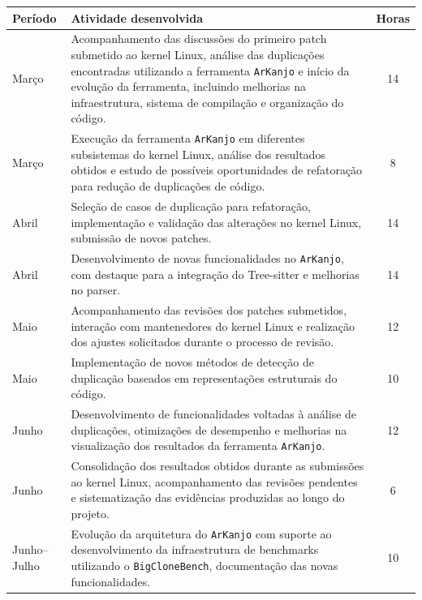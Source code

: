 \documentclass[twocolumn]{article}
\begin{document}
\begin{table}[ht]
\centering
\begin{tabularx}{\columnwidth}{l X c}
\toprule
\textbf{Período} & \textbf{Atividade desenvolvida} & \textbf{Horas} \\
\midrule

Março &
Acompanhamento das discussões do primeiro patch submetido ao kernel Linux, análise das duplicações encontradas utilizando a ferramenta \texttt{ArKanjo} e início da evolução da ferramenta, incluindo melhorias na infraestrutura, sistema de compilação e organização do código. &
14 \\

Março &
Execução da ferramenta \texttt{ArKanjo} em diferentes subsistemas do kernel Linux, análise dos resultados obtidos e estudo de possíveis oportunidades de refatoração para redução de duplicações de código. &
8 \\

Abril &
Seleção de casos de duplicação para refatoração, implementação e validação das alterações no kernel Linux, submissão de novos patches. &
14 \\

Abril &
Desenvolvimento de novas funcionalidades no \texttt{ArKanjo}, com destaque para a integração do Tree-sitter e melhorias no parser. &
14 \\

Maio &
Acompanhamento das revisões dos patches submetidos, interação com mantenedores do kernel Linux e realização dos ajustes solicitados durante o processo de revisão. &
12 \\

Maio &
Implementação de novos métodos de detecção de duplicação baseados em representações estruturais do código. &
10 \\

Junho &
Desenvolvimento de funcionalidades voltadas à análise de duplicações, otimizações de desempenho e melhorias na visualização dos resultados da ferramenta \texttt{ArKanjo}. &
12 \\

Junho &
Consolidação dos resultados obtidos durante as submissões ao kernel Linux, acompanhamento das revisões pendentes e sistematização das evidências produzidas ao longo do projeto. &
6 \\

Junho--Julho &
Evolução da arquitetura do \texttt{ArKanjo} com suporte ao desenvolvimento da infraestrutura de benchmarks utilizando o \texttt{BigCloneBench}, documentação das novas funcionalidades. &
10 \\

\bottomrule
\end{tabularx}
\end{table}

\twocolumn
\end{document}
